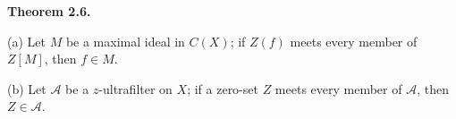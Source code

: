 \textbf{Theorem 2.6.}

(a) Let $M$ be a maximal ideal in $C(X)$; if $Z(f)$ meets every member of $Z[M]$, then $f \in M$.

(b) Let $\mathcal{A}$ be a $z$-ultrafilter on $X$; if a zero-set $Z$ meets every member of $\mathcal{A}$, then $Z \in \mathcal{A}$.
